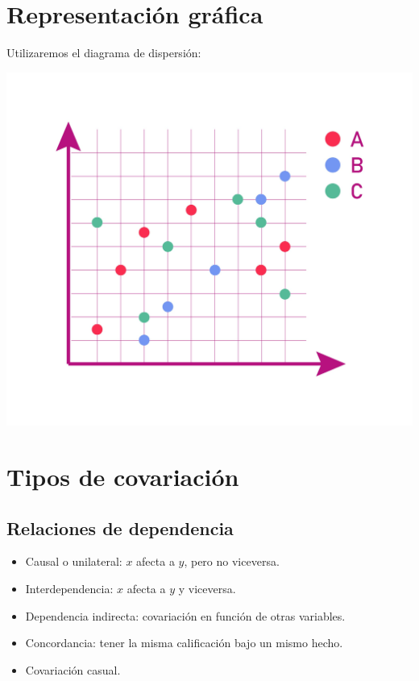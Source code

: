 \documentclass{article}
\begin{document}
\section{Representación gráfica}
Utilizaremos el diagrama de dispersión:
\begin{center}
    \includegraphics[scale=0.1]{dispersion}
\end{center}
\section{Tipos de covariación}
\subsection{Relaciones de dependencia}
\begin{itemize}
    \item Causal o unilateral: $x$ afecta a $y$, pero no viceversa.
    \item Interdependencia: $x$ afecta a $y$ y viceversa.
    \item Dependencia indirecta: covariación en función de otras variables.
    \item Concordancia: tener la misma calificación bajo un mismo hecho.
    \item Covariación casual.
\end{itemize}
\end{document}
